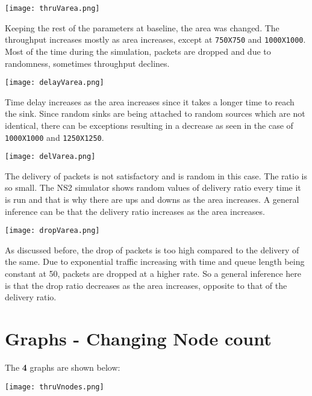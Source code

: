 \documentclass{article}
\begin{document}
\newpage

\begin{center}
    \texttt{[image: thruVarea.png]}
\end{center}

Keeping the rest of the parameters at baseline, the area was changed. The throughput increases mostly as area increases, except at \texttt{750X750} and \texttt{1000X1000}. Most of the time during the simulation, packets are dropped and due to randomness, sometimes throughput declines.

\begin{center}
    \texttt{[image: delayVarea.png]}
\end{center}

Time delay increases as the area increases since it takes a longer time to reach the sink. Since random sinks are being attached to random sources which are not identical, there can be exceptions resulting in a decrease as seen in the case of \texttt{1000X1000} and \texttt{1250X1250}.

\begin{center}
    \texttt{[image: delVarea.png]}
\end{center}

The delivery of packets is not satisfactory and is random in this case. The ratio is so small. The NS2 simulator shows random values of delivery ratio every time it is run and that is why there are ups and downs as the area increases. A general inference can be that the delivery ratio increases as the area increases.

\begin{center}
    \texttt{[image: dropVarea.png]}
\end{center}

As discussed before, the drop of packets is too high compared to the delivery of the same. Due to exponential traffic increasing with time and queue length being constant at 50, packets are dropped at a higher rate. So a general inference here is that the drop ratio decreases as the area increases, opposite to that of the delivery ratio.

\section{Graphs - Changing Node count}
The \textbf{4} graphs are shown below:

\begin{center}
    \texttt{[image: thruVnodes.png]}
\end{center}
\end{document}
